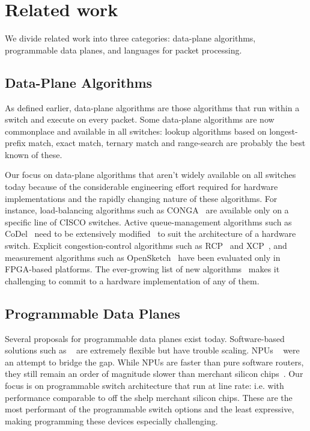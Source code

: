 \section{Related work}
\label{s:related}



We divide related work into three categories: data-plane algorithms, programmable
data planes, and languages for packet processing.

\subsection{Data-Plane Algorithms} 
As defined earlier, data-plane algorithms are those algorithms that run within
a switch and execute on every packet. Some data-plane algorithms are now
commonplace and available in all switches: lookup algorithms based on
longest-prefix match, exact match, ternary match and range-search are probably
the best known of these.

  Our focus on data-plane algorithms that aren't widely available on all
switches today because of the considerable engineering effort required for
hardware implementations and the rapidly changing nature of these algorithms.
For instance, load-balancing algorithms such as CONGA~\cite{conga} are
available only on a specific line of CISCO switches.  Active queue-management
algorithms such as CoDel~\cite{codel} need to be extensively
modified~\cite{pie} to suit the architecture of a hardware switch.  Explicit
congestion-control algorithms such as RCP~\cite{rcp} and XCP~\cite{xcp}, and
measurement algorithms such as OpenSketch~\cite{opensketch} have been evaluated
only in FPGA-based platforms.  The ever-growing list of new
algorithms~\cite{pdq, d3, detail} makes it challenging to commit to a hardware
implementation of any of them.

\subsection{Programmable Data Planes}
Several proposals for programmable data planes exist today. Software-based
solutions such as ~\cite{click, fastpass, flexplane} are extremely flexible but
have trouble scaling. NPUs ~\cite{intel} were an attempt to bridge the gap.
While NPUs are faster than pure software routers, they still remain an order of
magnitude slower than merchant silicon chips~\cite{rmt}. Our focus is on
programmable switch architecture that run at line rate: i.e. with performance
comparable to off the shelp merchant silicon chips. These are the most
performant of the programmable switch options and the least expressive, making
programming these devices especially challenging.

